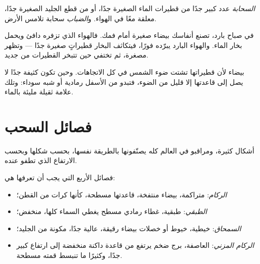 \begin{definition}\label{def:g4:clouds-rain-snow:cloud}
\emph{السحابة} عدد كبير جدًا من قطيرات الماء الصغيرة جدًا،
أو من قطع الجليد الصغيرة جدًا، معلقة معًا في الهواء. و\emph{الضباب}
سحابة تلامس الأرض.
\end{definition}

\begin{example}\label{ex:g4:clouds-rain-snow:breath}
في صباح بارد، تصنع أنفاسك  بيضاء صغيرة أمام فمك. فالهواء الذي تزفره
دافئ ويحمل بخار الماء. والهواء البارد يبرّده فورًا، فيتكاثف البخار قطيراتٍ
صغيرة جدًا --- وتظهر  مصغرة، ثم تختفي حين تتبخر القطيرات من
جديد.
\end{example}

 بيضاء لأن قطيراتها تشتت ضوء الشمس في كل الاتجاهات. وحين تكون
كثيفة جدًا لا يصل إلى قاعدتها إلا قليل من الضوء، فتبدو من الأسفل رمادية
أو شبه سوداء: وتلك علامة  ثقيلة مليئة
بالماء.

\section{فصائل السحب}

 أشكال كثيرة، ومراقبو  في العالم كله يصنّفونها بالطريقة نفسها،
بحسب شكلها وبحسب الارتفاع الذي تطفو عنده.

\begin{definition}\label{def:g4:clouds-rain-snow:cloud-families}
فصائل  الأربع التي يجب أن تعرفها هي:
\begin{itemize}
  \item \emph{الركام}:  متراكمة، بيضاء منتفخة، قاعدتها
        مسطحة، كأنها كرات من القطن؛
  \item \emph{الطبقي}:  طبقية، غطاء رمادي مسطح يغطي
        السماء كلها، منخفض؛
  \item \emph{السمحاق}:  خيطية، خيوط أو خصلات بيضاء رقيقة،
        عالية جدًا، مكونة من الجليد؛
  \item \emph{الركام المزني}:  العاصفة، برج ضخم
        يرتفع من قاعدة داكنة منخفضة إلى ارتفاع كبير جدًا، وكثيرًا ما تنبسط
        قمته مسطحة.
\end{itemize}
\end{definition}

